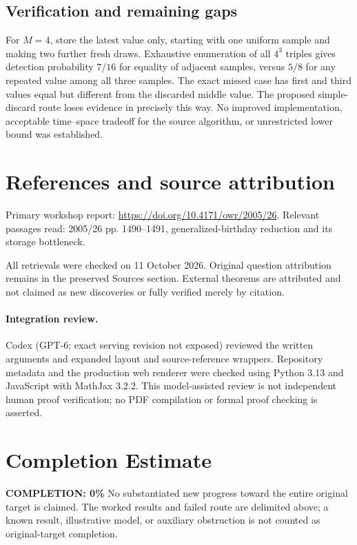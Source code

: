 \documentclass[11pt]{article}
\begin{document}
\subsection{Verification and remaining gaps}
For $M=4$, store the latest value only, starting with one uniform sample and making two further fresh draws. Exhaustive enumeration of all $4^3$ triples gives detection probability $7/16$ for equality of adjacent samples, versus $5/8$ for any repeated value among all three samples. The exact missed case has first and third values equal but different from the discarded middle value. The proposed simple-discard route loses evidence in precisely this way. No improved implementation, acceptable time--space tradeoff for the source algorithm, or unrestricted lower bound was established.

\section{References and source attribution}
Primary workshop report: \url{https://doi.org/10.4171/owr/2005/26}. Relevant passages read: 2005/26 pp. 1490--1491, generalized-birthday reduction and its storage bottleneck.

All retrievals were checked on 11 October 2026. Original question attribution remains in the preserved Sources section. External theorems are attributed and not claimed as new discoveries or fully verified merely by citation.


\paragraph{Integration review.} Codex (GPT-6; exact serving revision not exposed) reviewed the written arguments and expanded layout and source-reference wrappers. Repository metadata and the production web renderer were checked using Python 3.13 and JavaScript with MathJax 3.2.2. This model-assisted review is not independent human proof verification; no PDF compilation or formal proof checking is asserted.

\section{Completion Estimate}
\noindent\textbf{COMPLETION: 0\%}
No substantiated new progress toward the entire original target is claimed. The worked results and failed route are delimited above; a known result, illustrative model, or auxiliary obstruction is not counted as original-target completion.
\end{document}
